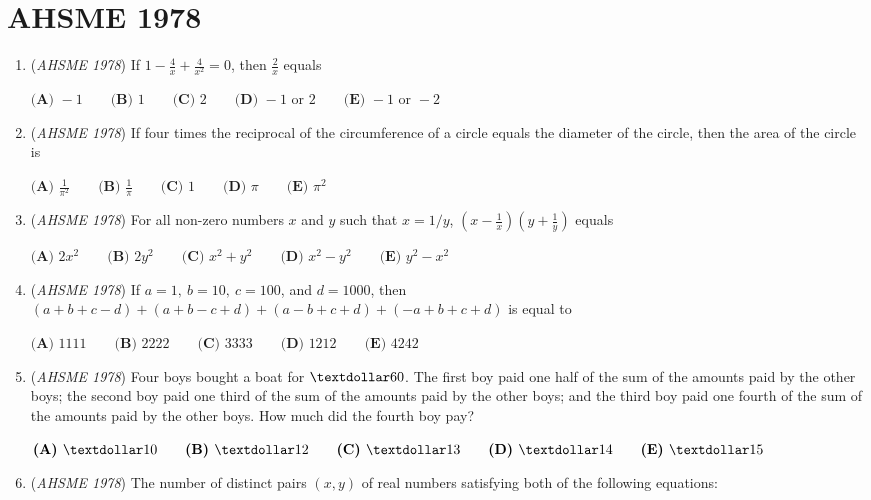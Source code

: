\section{AHSME 1978}
        \begin{enumerate}
        	\item (\textit{AHSME 1978}) If $1-\frac{4}{x}+\frac{4}{x^2}=0$, then $\frac{2}{x}$ equals


 $\textbf{(A) }-1\qquad \textbf{(B) }1\qquad \textbf{(C) }2\qquad \textbf{(D) }-1\text{ or }2\qquad  \textbf{(E) }-1\text{ or }-2$


	\item (\textit{AHSME 1978}) If four times the reciprocal of the circumference of a circle equals the diameter of the circle, then the area of the circle is 


 $\textbf{(A) }\frac{1}{\pi^2}\qquad \textbf{(B) }\frac{1}{\pi}\qquad \textbf{(C) }1\qquad \textbf{(D) }\pi\qquad \textbf{(E) }\pi^2$


	\item (\textit{AHSME 1978}) For all non-zero numbers $x$ and $y$ such that $x = 1/y$, $\left(x-\frac{1}{x}\right)\left(y+\frac{1}{y}\right)$ equals


 $\textbf{(A) }2x^2\qquad \textbf{(B) }2y^2\qquad \textbf{(C) }x^2+y^2\qquad \textbf{(D) }x^2-y^2\qquad  \textbf{(E) }y^2-x^2$


	\item (\textit{AHSME 1978}) If $a = 1,~ b = 10, ~c = 100$, and $d = 1000$, then $(a+ b+ c-d) + (a + b- c+ d) +(a-b+ c+d)+ (-a+ b+c+d)$ is equal to


 $\textbf{(A) }1111\qquad \textbf{(B) }2222\qquad \textbf{(C) }3333\qquad \textbf{(D) }1212\qquad  \textbf{(E) }4242$


	\item (\textit{AHSME 1978}) Four boys bought a boat for $\textdollar 60$. The first boy paid one half of the sum of the amounts paid by the other boys; 
the second boy paid one third of the sum of the amounts paid by the other boys; 
and the third boy paid one fourth of the sum of the amounts paid by the other boys. How much did the fourth boy pay? 


 $\textbf{(A) }\textdollar 10\qquad \textbf{(B) }\textdollar 12\qquad \textbf{(C) }\textdollar 13\qquad \textbf{(D) }\textdollar 14\qquad \textbf{(E) }\textdollar 15$


	\item (\textit{AHSME 1978}) The number of distinct pairs $(x,y)$ of real numbers satisfying both of the following equations: 



\end{enumerate}
